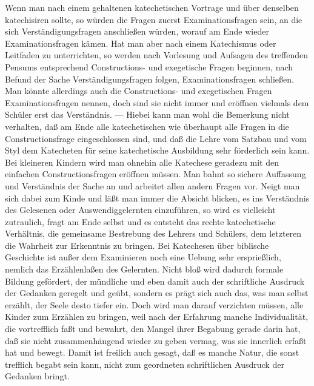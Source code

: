 Wenn man nach einem gehaltenen katechetischen Vortrage und über denselben katechisiren sollte, so würden die Fragen zuerst Examinationsfragen sein, an die sich Verständigungsfragen anschließen würden, worauf am Ende wieder Examinationsfragen kämen. Hat man aber nach einem Katechismus oder Leitfaden zu unterrichten, so werden nach Vorlesung und Aufsagen des treffenden Pensums entsprechend Constructions- und exegetische Fragen beginnen, nach Befund der Sache Verständigungsfragen folgen, Examinationsfragen schließen. Man könnte allerdings auch die Constructions- und exegetischen Fragen Examinationsfragen nennen, doch sind sie nicht immer und eröffnen vielmals dem Schüler erst das Verständnis. — Hiebei kann man wohl die Bemerkung nicht verhalten, daß am Ende alle katechetischen wie überhaupt alle Fragen in die Constructionsfrage eingeschlossen sind, und daß die Lehre vom Satzbau und vom Styl dem Katecheten für seine katechetische Ausbildung sehr förderlich sein kann. Bei kleineren Kindern wird man ohnehin alle Katechese geradezu mit den
einfachen Constructionsfragen eröffnen müssen. Man bahnt so sichere Auffassung und Verständnis der Sache an und arbeitet allen andern Fragen vor. Neigt man sich dabei zum Kinde und läßt man immer die Absicht blicken, es ins Verständnis des Gelesenen oder Auswendiggelernten einzuführen, so wird es vielleicht zutraulich, fragt am Ende selbst und es entsteht das rechte katechetische Verhältnis, die gemeinsame Bestrebung des Lehrers und Schülers, dem letzteren die Wahrheit zur Erkenntnis zu bringen. Bei Katechesen über biblische Geschichte ist außer dem Examinieren noch eine Uebung sehr ersprießlich, nemlich das Erzählenlaßen des Gelernten. Nicht bloß wird dadurch formale Bildung gefördert, der mündliche und eben damit auch der schriftliche Ausdruck der Gedanken geregelt und geübt, sondern es prägt sich auch das, was man selbst erzählt, der Seele desto tiefer ein. Doch wird man darauf verzichten müssen, alle Kinder zum Erzählen zu bringen, weil nach der Erfahrung manche Individualität, die vortrefflich faßt und bewahrt, den Mangel ihrer Begabung gerade darin hat, daß sie nicht zusammenhängend wieder zu geben vermag, was sie innerlich erfaßt hat und bewegt. Damit ist freilich auch gesagt, daß es manche Natur, die sonst trefflich begabt sein kann, nicht zum geordneten schriftlichen Ausdruck der Gedanken bringt.

